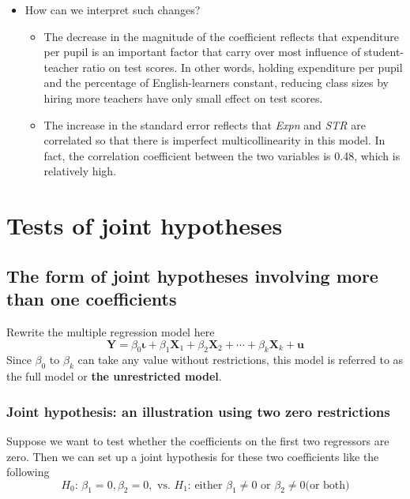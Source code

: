 \documentclass[a4paper,11pt]{article}
\begin{document}
\begin{itemize}
\item How can we interpret such changes?
\label{sec:org08b8e9a}

\begin{itemize}
\item The decrease in the magnitude of the coefficient reflects that
expenditure per pupil is an important factor that carry over most
influence of student-teacher ratio on test scores. In other words,
holding expenditure per pupil and the percentage of English-learners
constant, reducing class sizes by hiring more teachers have only
small effect on test scores.

\item The increase in the standard error reflects that \emph{Expn} and \emph{STR}
are correlated so that there is imperfect multicollinearity in this
model. In fact, the correlation coefficient between the two
variables is 0.48, which is relatively high.
\end{itemize}
\end{itemize}


\section{Tests of joint hypotheses}
\label{sec:org496e53f}

\subsection{The form of joint hypotheses involving more than one coefficients}
\label{sec:orge91f6f0}

Rewrite the multiple regression model here
\begin{equation}
\label{eq:fullmodel}
\mathbf{Y} = \beta_0 \boldsymbol{\iota} + \beta_1 \mathbf{X}_1 + \beta_2 \mathbf{X}_2 + \cdots + \beta_k \mathbf{X}_k + \mathbf{u}
\end{equation}
Since \(\beta_0\) to \(\beta_k\) can take any value without restrictions,
this model is referred to as the full model or \textbf{the unrestricted
model}.

\subsubsection*{Joint hypothesis: an illustration using two zero restrictions}
\label{sec:orga76a1e5}

Suppose we want to test whether the coefficients on the first two
regressors are zero. Then we can set up a joint hypothesis for these two
coefficients like the following
 \[ H_0:\, \beta_1 = 0, \beta_2 = 0, \text{ vs. }
H_1:\, \text{either } \beta_1 \neq 0 \text{ or } \beta_2 \neq 0 \text{
(or both)} \]
\end{document}
